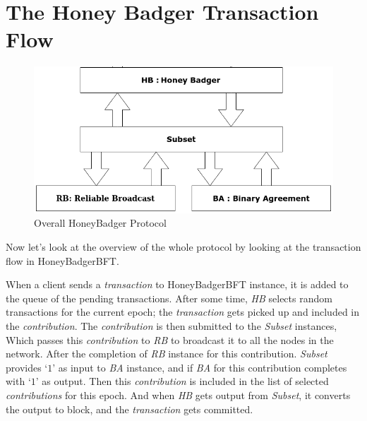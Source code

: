 \section{The Honey Badger Transaction Flow}
\begin{figure}[!h]
    \centering
    \includegraphics[scale=0.7]{images/overall.png}
    \caption{Overall HoneyBadger Protocol\cite{POANetwork}}
    \label{fig:overall}
\end{figure}

Now let's look at the overview of the whole protocol by looking at the transaction flow in HoneyBadgerBFT.


When a client sends a \textit{transaction} to HoneyBadgerBFT instance, it is added to the queue of the pending transactions. After some time, \textit{HB} selects random transactions for the current epoch; the \textit{transaction} gets picked up and included in the \textit{contribution}. The \textit{contribution} is then submitted to the \textit{Subset} instances, Which passes this \textit{contribution} to \textit{RB} to broadcast it to all the nodes in the network. After the completion of \textit{RB} instance for this contribution. \textit{Subset} provides `$1$' as input to \textit{BA} instance, and if \textit{BA} for this contribution completes with `$1$' as output. Then this \textit{contribution} is included in the list of selected \textit{contributions} for this epoch. And when \textit{HB} gets output from \textit{Subset}, it converts the output to block, and the \textit{transaction} gets committed. 